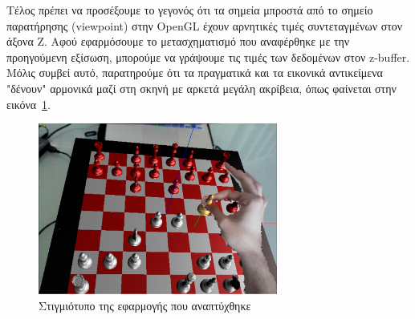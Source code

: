 Τέλος πρέπει να προσέξουμε το γεγονός ότι τα σημεία μπροστά από το σημείο παρατήρησης (viewpoint) στην OpenGL έχουν αρνητικές τιμές συντεταγμένων στον άξονα Z. Αφού εφαρμόσουμε το μετασχηματισμό που αναφέρθηκε με την προηγούμενη εξίσωση, μπορούμε να γράψουμε τις τιμές των δεδομένων στον z-buffer. Μόλις συμβεί αυτό, παρατηρούμε ότι τα πραγματικά και τα εικονικά αντικείμενα "δένουν" αρμονικά μαζί στη σκηνή με αρκετά μεγάλη ακρίβεια, όπως φαίνεται στην εικόνα~\ref{fig:occlusion}.



\begin{figure}[H]
    \centering
    \includegraphics[width=0.7\textwidth]{Files/Figures/correct.png}
    \caption[Στιγμιότυπο της εφαρμογής που αναπτύχθηκε]{Στιγμιότυπο της εφαρμογής που αναπτύχθηκε}
    \label{fig:occlusion}
\end{figure}











